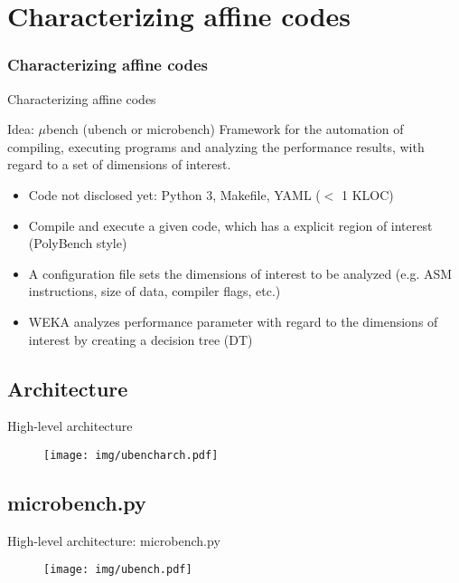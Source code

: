 \documentclass[xcolor=table,hideothersubsections,aspectratio=1610]{beamer}
\begin{document}
\section{Characterizing affine codes}
\frametitle{Characterizing affine codes}
\begin{frame}{Characterizing affine codes}
\begin{block}{Idea: $\mu$bench (ubench or microbench)}
Framework for the automation of compiling, executing programs and analyzing the performance results, with regard to a set of dimensions of interest.
\end{block}

\begin{itemize}
    \item Code not disclosed yet: Python 3, Makefile, YAML ($<$ 1 KLOC)
    \item Compile and execute a given code, which has a explicit region of interest (PolyBench style)
    \item A configuration file sets the dimensions of interest to be analyzed (e.g. ASM instructions, size of data, compiler flags, etc.)
    \item WEKA analyzes performance parameter with regard to the dimensions of interest by creating a decision tree (DT)
\end{itemize}

\end{frame}

\subsection{Architecture}
\begin{frame}{High-level architecture}
\begin{figure}
    \centering
    \texttt{[image: img/ubencharch.pdf]}
\end{figure}
\end{frame}

\subsection{microbench.py}
\begin{frame}{High-level architecture: microbench.py}
\begin{figure}
    \centering
    \texttt{[image: img/ubench.pdf]}
\end{figure}
\end{frame}
\end{document}
